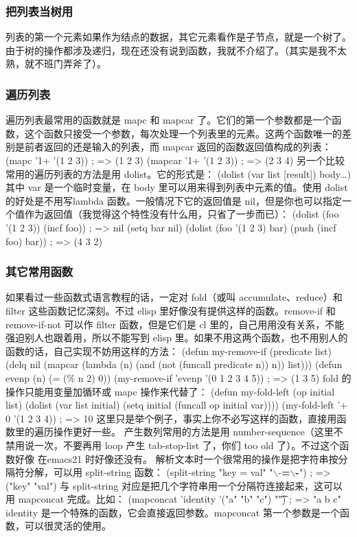 \documentclass[11pt]{ctexart}
\begin{document}
\subsubsection{把列表当树用}
\label{sec:org8d644cc}
列表的第一个元素如果作为结点的数据，其它元素看作是子节点，就是一个树了。由于树的操作都涉及递归，现在还没有说到函数，我就不介绍了。（其实是我不太熟，就不班门弄斧了）。
\subsubsection{遍历列表}
\label{sec:org5983396}
遍历列表最常用的函数就是 mapc 和 mapcar 了。它们的第一个参数都是一个函数，这个函数只接受一个参数，每次处理一个列表里的元素。这两个函数唯一的差别是前者返回的还是输入的列表，而 mapcar 返回的函数返回值构成的列表：
(mapc '1+ '(1 2 3))                     ; => (1 2 3)
(mapcar '1+ '(1 2 3))                   ; => (2 3 4)
另一个比较常用的遍历列表的方法是用 dolist。它的形式是：
(dolist (var list [result]) body\ldots{})
其中 var 是一个临时变量，在 body 里可以用来得到列表中元素的值。使用 dolist 的好处是不用写lambda 函数。一般情况下它的返回值是 nil，但是你也可以指定一个值作为返回值（我觉得这个特性没有什么用，只省了一步而已）：
(dolist (foo '(1 2 3))
(incf foo))                           ; => nil
(setq bar nil)
(dolist (foo '(1 2 3) bar)
(push (incf foo) bar))                ; => (4 3 2)
\subsubsection{其它常用函数}
\label{sec:org9de67da}
如果看过一些函数式语言教程的话，一定对 fold（或叫 accumulate、reduce）和 filter 这些函数记忆深刻。不过 elisp 里好像没有提供这样的函数。remove-if 和 remove-if-not 可以作 filter 函数，但是它们是 cl 里的，自己用用没有关系，不能强迫别人也跟着用，所以不能写到 elisp 里。如果不用这两个函数，也不用别人的函数的话，自己实现不妨用这样的方法：
(defun my-remove-if (predicate list)
(delq nil (mapcar (lambda (n)
(and (not (funcall predicate n)) n))
list)))
(defun evenp (n)
(= (\% n 2) 0))
(my-remove-if 'evenp '(0 1 2 3 4 5))    ; => (1 3 5)
fold 的操作只能用变量加循环或 mapc 操作来代替了：
(defun my-fold-left (op initial list)
(dolist (var list initial)
(setq initial (funcall op initial var))))
(my-fold-left '+ 0 '(1 2 3 4))          ; => 10
这里只是举个例子，事实上你不必写这样的函数，直接用函数里的遍历操作更好一些。
产生数列常用的方法是用 number-sequence（这里不禁用说一次，不要再用 loop 产生 tab-stop-list 了，你们 too old 了）。不过这个函数好像 在emacs21 时好像还没有。
解析文本时一个很常用的操作是把字符串按分隔符分解，可以用 split-string 函数：
(split-string "key = val" "$\backslash$\s-\textbf{=$\backslash$\s-}")  ; => ("key" "val")
与 split-string 对应是把几个字符串用一个分隔符连接起来，这可以用 mapconcat 完成。比如：
(mapconcat 'identity '("a" "b" "c") "\t") ; => "a   b   c"
identity 是一个特殊的函数，它会直接返回参数。mapconcat 第一个参数是一个函数，可以很灵活的使用。
\end{document}
